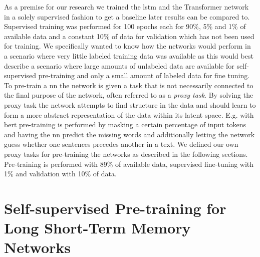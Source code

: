 As a premise for our research we trained the \gls{lstm} and the Transformer network in a solely supervised fashion to get a baseline later results can be compared to. Supervised training was performed for 100 epochs each for 90\%, 5\% and 1\% of available data and a constant 10\% of data for validation which has not been used for training. We specifically wanted to know how the networks would perform in a scenario where very little labeled training data was available as this would best describe a scenario where large amounts of unlabeled data are available for self-supervised pre-training and only a small amount of labeled data for fine tuning. To pre-train a \gls{nn} the network is given a task that is not necessarily connected to the final purpose of the network, often referred to as a \textit{proxy task}. By solving the proxy task the network attempts to find structure in the data and should learn to form a more abstract representation of the data within its latent space. E.g. with \gls{bert} pre-training is performed by masking a certain percentage of input tokens and having the \gls{nn} predict the missing words and additionally letting the network guess whether one sentences precedes another in a text. We defined our own proxy tasks for pre-training the networks as described in the following sections. Pre-training is performed with 89\% of available data, supervised fine-tuning with 1\% and validation with 10\% of data.


\section{Self-supervised Pre-training for Long Short-Term Memory Networks} \label{sec:experiments_lstm}

